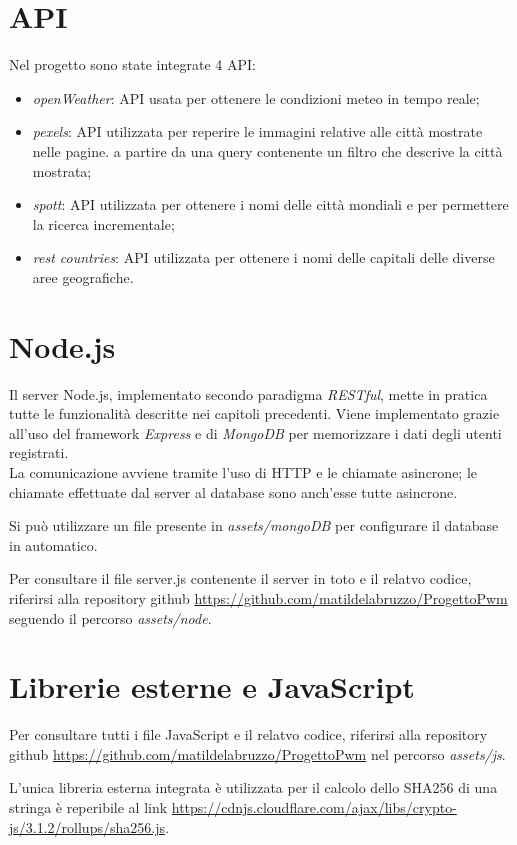 \section{API}

Nel progetto sono state integrate 4 API:
\begin{itemize}
    \item \emph{openWeather}: API usata per ottenere le condizioni meteo in tempo reale;
    \item \emph{pexels}: API utilizzata per reperire le immagini relative alle città mostrate nelle pagine. a partire da una query contenente un filtro che descrive la città mostrata;
    \item \emph{spott}: API utilizzata per ottenere i nomi delle città mondiali e per permettere la ricerca incrementale;
    \item \emph{rest countries}: API utilizzata per ottenere i nomi delle capitali delle diverse aree geografiche.
\end{itemize}

\section{Node.js}

Il server Node.js, implementato secondo paradigma \emph{RESTful}, mette in pratica tutte le funzionalità descritte nei capitoli precedenti. Viene implementato
grazie all'uso del framework \emph{Express} e di \emph{MongoDB} per memorizzare i dati degli utenti registrati.\\
La comunicazione avviene tramite l'uso di HTTP e le chiamate asincrone; le chiamate effettuate dal server al database sono anch'esse tutte asincrone.

\vspace{5mm}

Si può utilizzare un file presente in \emph{assets/mongoDB} per configurare il database in automatico.

\vspace{5mm}

Per consultare il file server.js contenente il server in toto e il relatvo codice,
riferirsi alla repository github \url{https://github.com/matildelabruzzo/ProgettoPwm} seguendo il percorso \emph{assets/node}.

\section{Librerie esterne e JavaScript}

Per consultare tutti i file JavaScript e il relatvo codice, riferirsi alla repository github \url{https://github.com/matildelabruzzo/ProgettoPwm}
nel percorso \emph{assets/js}.

L'unica libreria esterna integrata è utilizzata per il calcolo dello SHA256 di una stringa è reperibile al link \url{https://cdnjs.cloudflare.com/ajax/libs/crypto-js/3.1.2/rollups/sha256.js}.